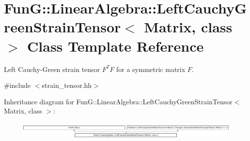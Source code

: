 \hypertarget{classFunG_1_1LinearAlgebra_1_1LeftCauchyGreenStrainTensor}{\section{Fun\-G\-:\-:Linear\-Algebra\-:\-:Left\-Cauchy\-Green\-Strain\-Tensor$<$ Matrix, class $>$ Class Template Reference}
\label{classFunG_1_1LinearAlgebra_1_1LeftCauchyGreenStrainTensor}
}


Left Cauchy-\/\-Green strain tensor $ F^T F $ for a symmetric matrix $ F $.  




{\ttfamily \#include $<$strain\-\_\-tensor.\-hh$>$}

Inheritance diagram for Fun\-G\-:\-:Linear\-Algebra\-:\-:Left\-Cauchy\-Green\-Strain\-Tensor$<$ Matrix, class $>$\-:\begin{figure}[H]
\begin{center}
\leavevmode
\includegraphics[height=0.898876cm]{classFunG_1_1LinearAlgebra_1_1LeftCauchyGreenStrainTensor}
\end{center}
\end{figure}
